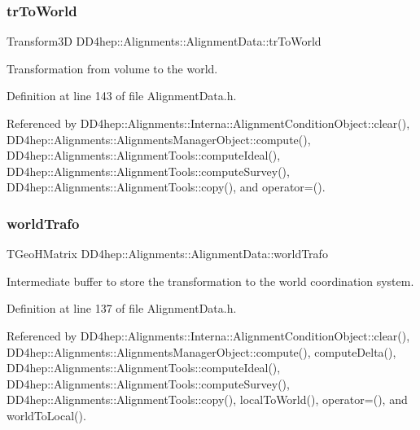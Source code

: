 \subsubsection{\texorpdfstring{tr\+To\+World}{trToWorld}}
{\footnotesize\ttfamily Transform3D D\+D4hep\+::\+Alignments\+::\+Alignment\+Data\+::tr\+To\+World}



Transformation from volume to the world. 



Definition at line 143 of file Alignment\+Data.\+h.



Referenced by D\+D4hep\+::\+Alignments\+::\+Interna\+::\+Alignment\+Condition\+Object\+::clear(), D\+D4hep\+::\+Alignments\+::\+Alignments\+Manager\+Object\+::compute(), D\+D4hep\+::\+Alignments\+::\+Alignment\+Tools\+::compute\+Ideal(), D\+D4hep\+::\+Alignments\+::\+Alignment\+Tools\+::compute\+Survey(), D\+D4hep\+::\+Alignments\+::\+Alignment\+Tools\+::copy(), and operator=().

\hypertarget{class_d_d4hep_1_1_alignments_1_1_alignment_data_a87234aee58d8e087377b029de83ebcd8}{}\label{class_d_d4hep_1_1_alignments_1_1_alignment_data_a87234aee58d8e087377b029de83ebcd8} 
\subsubsection{\texorpdfstring{world\+Trafo}{worldTrafo}}
{\footnotesize\ttfamily T\+Geo\+H\+Matrix D\+D4hep\+::\+Alignments\+::\+Alignment\+Data\+::world\+Trafo\hspace{0.3cm}{\ttfamily [mutable]}}



Intermediate buffer to store the transformation to the world coordination system. 



Definition at line 137 of file Alignment\+Data.\+h.



Referenced by D\+D4hep\+::\+Alignments\+::\+Interna\+::\+Alignment\+Condition\+Object\+::clear(), D\+D4hep\+::\+Alignments\+::\+Alignments\+Manager\+Object\+::compute(), compute\+Delta(), D\+D4hep\+::\+Alignments\+::\+Alignment\+Tools\+::compute\+Ideal(), D\+D4hep\+::\+Alignments\+::\+Alignment\+Tools\+::compute\+Survey(), D\+D4hep\+::\+Alignments\+::\+Alignment\+Tools\+::copy(), local\+To\+World(), operator=(), and world\+To\+Local().




